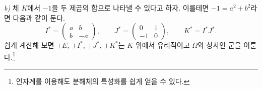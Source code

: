 \documentclass[11pt]{article}
\newcommand{\mat}[1]{\begin{pmatrix}#1\end{pmatrix}}
\begin{document}
\emph{b)} 체 $K$에서 $-1$을 두 제곱의 합으로 나타낼 수 있다고 하자. 이를테면 $-1=a^2+b^2$라면 다음과 같이 둔다.
\[
        I^*=\mat{a&b\\ b&-a},\qquad
        J^*=\mat{0&1\\-1&0},\qquad
        K^*=I^*J^*.
\]
쉽게 계산해 보면 $\pm E$, $\pm I^*$, $\pm J^*$, $\pm K^*$는 $K$ 위에서 유리적이고 $\Omega$와 상사인 군을 이룬다.\footnote{인자계를 이용해도 분해체의 특성화를 쉽게 얻을 수 있다.}
\end{document}
